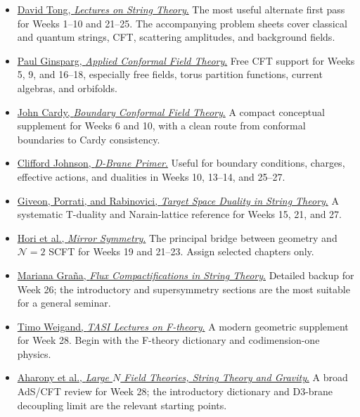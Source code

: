 \documentclass[11pt]{article}
\begin{document}
\begin{itemize}[leftmargin=1.4em,itemsep=6pt]
  \item \href{https://www.damtp.cam.ac.uk/user/dt281/string.html}{David Tong,
  \emph{Lectures on String Theory}.}  The most useful alternate first pass for
  Weeks 1--10 and 21--25.  The accompanying problem sheets cover classical and
  quantum strings, CFT, scattering amplitudes, and background fields.

  \item \href{https://arxiv.org/abs/hep-th/9108028}{Paul Ginsparg,
  \emph{Applied Conformal Field Theory}.}  Free CFT support for Weeks 5, 9,
  and 16--18, especially free fields, torus partition functions, current
  algebras, and orbifolds.

  \item \href{https://arxiv.org/abs/hep-th/0411189}{John Cardy,
  \emph{Boundary Conformal Field Theory}.}  A compact conceptual supplement
  for Weeks 6 and 10, with a clean route from conformal boundaries to Cardy
  consistency.

  \item \href{https://arxiv.org/abs/hep-th/0007170}{Clifford Johnson,
  \emph{D-Brane Primer}.}  Useful for boundary conditions, charges, effective
  actions, and dualities in Weeks 10, 13--14, and 25--27.

  \item \href{https://arxiv.org/abs/hep-th/9401139}{Giveon, Porrati, and
  Rabinovici, \emph{Target Space Duality in String Theory}.}  A systematic
  T-duality and Narain-lattice reference for Weeks 15, 21, and 27.

  \item \href{https://www.claymath.org/resource/mirror-symmetry/mirror-symmetry-2/}{Hori
  et al., \emph{Mirror Symmetry}.}  The principal bridge between geometry and
  $\mathcal N=2$ SCFT for Weeks 19 and 21--23.  Assign selected chapters only.

  \item \href{https://arxiv.org/abs/hep-th/0509003}{Mariana Gra\~na,
  \emph{Flux Compactifications in String Theory}.}  Detailed backup for Week
  26; the introductory and supersymmetry sections are the most suitable for a
  general seminar.

  \item \href{https://arxiv.org/abs/1806.01854}{Timo Weigand,
  \emph{TASI Lectures on F-theory}.}  A modern geometric supplement for Week
  28.  Begin with the F-theory dictionary and codimension-one physics.

  \item \href{https://arxiv.org/abs/hep-th/9905111}{Aharony et al.,
  \emph{Large $N$ Field Theories, String Theory and Gravity}.}  A broad AdS/CFT
  review for Week 28; the introductory dictionary and D3-brane decoupling limit
  are the relevant starting points.
\end{itemize}
\end{document}
